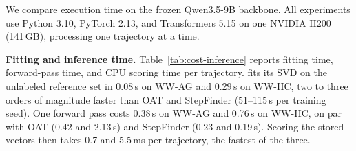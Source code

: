 %

We compare execution time on the frozen Qwen3.5-9B backbone. All experiments use Python 3.10, PyTorch 2.13, and Transformers 5.15 on one NVIDIA H200 (141\,GB), processing one trajectory at a time.

\textbf{Fitting and inference time.}
Table~\ref{tab:cost-inference} reports fitting time, forward-pass time, and CPU scoring time per trajectory. \soap{} fits its SVD on the unlabeled reference set in 0.08\,s on \textsc{WW-AG} and 0.29\,s on \textsc{WW-HC}, two to three orders of magnitude faster than OAT and StepFinder (51--115\,s per training seed). One forward pass costs 0.38\,s on \textsc{WW-AG} and 0.76\,s on \textsc{WW-HC}, on par with OAT (0.42 and 2.13\,s) and StepFinder (0.23 and 0.19\,s). Scoring the stored vectors then takes 0.7 and 5.5\,ms per trajectory, the fastest of the three.


